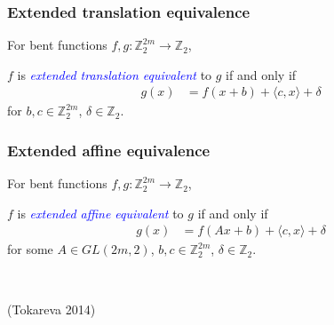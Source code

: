 \documentclass[pdf,sprung,slideColor,nocolorBG]{beamer}
\newenvironment{colortheme}[1]{
\def\ProvidesPackageRCS $##1${\relax}
\renewcommand{\ProcessOptions}{\relax}
\makeatletter

\makeatother
}{}
\newcommand{\slidecite}[1]{\tiny{(#1)}\normalsize{}}
\newcommand{\mb}[1]{\mathbb{#1}}
\newcommand{\Emph}[1]{\emph{\textcolor{blue}{#1}}}
\newcommand{\To}{\rightarrow}
\newcommand{\Z}{\mb{Z}}
\begin{document}
\begin{colortheme}{jubata}
\begin{frame}
\frametitle{Extended translation equivalence}

\begin{Definition}
For bent functions $f,g : \Z_2^{2m} \To \Z_2$, 

$f$ is \Emph{extended translation equivalent} to $g$ if and only if
\begin{align*}
g(x) &= f(x + b) + \langle c, x \rangle + \delta 
\end{align*}
for $b, c \in \Z_2^{2m}$, $\delta \in \Z_2$.
\end{Definition}
\end{frame}
\end{colortheme}

\begin{colortheme}{seagull}
\begin{frame}
\frametitle{Extended affine equivalence}

\begin{Definition}
For bent functions $f,g : \Z_2^{2m} \To \Z_2$, 

$f$ is \Emph{extended affine equivalent} to $g$ if and only if
\begin{align*}
g(x) &= f(A x + b) + \langle c, x \rangle + \delta 
\end{align*}
for some $A \in GL(2m,2)$, $b, c \in \Z_2^{2m}$, $\delta \in \Z_2$.
\end{Definition}
~

\slidecite{Tokareva 2014}
\end{frame}
\end{colortheme}
\end{document}
